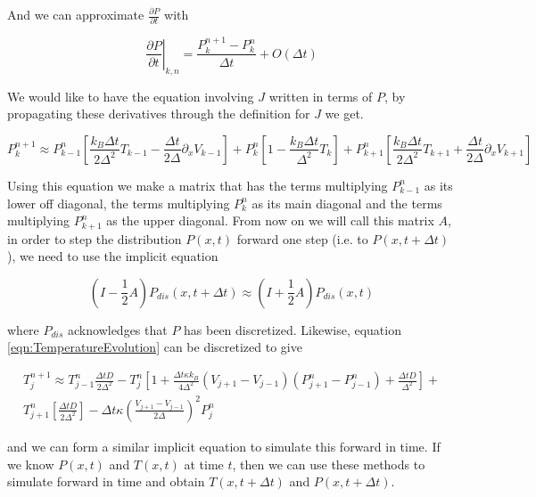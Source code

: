 \documentclass[11pt]{article} %
\begin{document}
And we can approximate $\frac{\partial P}{\partial t}$ with

\begin{equation}
\left. \frac{\partial P}{\partial t} \right|_{k, n} = \frac{P_k^{n+1} - P_k^n}{\Delta t} + O(\Delta t)
\end{equation}

We would like to have the equation involving $J$ written in terms of $P$, by propagating these derivatives through the definition for $J$ we get.

\begin{equation}
P_{k}^{n+1} \approx P_{k-1}^n \left [ \frac{k_B \Delta t}{2 \Delta^2} T_{k-1} - \frac{\Delta t}{2 \Delta} \partial_x V_{k-1} \right ] +
 P_k^n \left [1 - \frac{k_B \Delta t}{\Delta^2} T_k \right] +
 P_{k+1}^n \left [ \frac{k_B \Delta t}{2 \Delta^2}T_{k+1} + \frac{\Delta t}{2 \Delta} \partial_x V_{k+1} \right]
\end{equation}

Using this equation we make a matrix that has the terms multiplying $P_{k-1}^n$ as its lower off diagonal, the terms multiplying $P_k^n$ as its main diagonal and the terms multiplying $P_{k+1}^n$ as the upper diagonal. From now on we will call this matrix $A$, in order to step the distribution $P(x, t)$ forward one step (i.e. to $P(x, t + \Delta t)$), we need to use the implicit equation

\begin{equation}
\left (I - \frac{1}{2} A \right) P_{dis}(x, t + \Delta t) \approx \left(I + \frac{1}{2}A \right)P_{dis}(x, t)
\end{equation}

where $P_{dis}$ acknowledges that $P$ has been discretized. Likewise, equation \ref{eqn:TemperatureEvolution} can be discretized to give

\begin{multline}
T^{n+1}_j \approx T^n_{j-1} \frac{\Delta t D}{2 \Delta^2} - T^n_j \left[1 + \frac{\Delta t \kappa k_B}{4 \Delta^2}(V_{j+1} - V_{j-1})(P^n_{j+1} - P^n_{j-1}) + \frac{\Delta t D}{\Delta^2} \right] + \\
 T^n_{j+1} \left [\frac{\Delta t D}{2 \Delta^2} \right] - \Delta t \kappa \left(\frac{V_{j+1} - V_{j-1}}{2 \Delta} \right )^2 P^n_j
\end{multline}

and we can form a similar implicit equation to simulate this forward in time. If we know $P(x, t)$ and $T(x, t)$ at time $t$, then we can use these methods to simulate forward in time and obtain $T(x, t + \Delta t)$ and $P(x, t + \Delta t)$.
\end{document}
